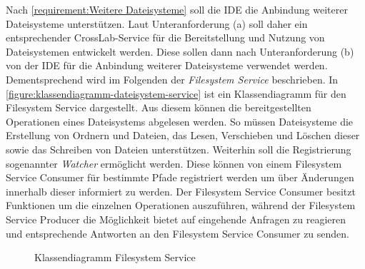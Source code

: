 Nach \autoref{requirement:Weitere Dateisysteme} soll die IDE die Anbindung weiterer Dateisysteme unterstützen. Laut Unteranforderung (a) soll daher ein entsprechender CrossLab-Service für die Bereitstellung und Nutzung von Dateisystemen entwickelt werden. Diese sollen dann nach Unteranforderung (b) von der IDE für die Anbindung weiterer Dateisysteme verwendet werden. Dementsprechend wird im Folgenden der \textit{Filesystem Service} beschrieben. In \autoref{figure:klassendiagramm-dateisystem-service} ist ein Klassendiagramm für den Filesystem Service dargestellt. Aus diesem können die bereitgestellten Operationen eines Dateisystems abgelesen werden. So müssen Dateisysteme die Erstellung von Ordnern und Dateien, das Lesen, Verschieben und Löschen dieser sowie das Schreiben von Dateien unterstützen. Weiterhin soll die Registrierung sogenannter \textit{Watcher} ermöglicht werden. Diese können von einem Filesystem Service Consumer für bestimmte Pfade registriert werden um über Änderungen innerhalb dieser informiert zu werden. Der Filesystem Service Consumer besitzt Funktionen um die einzelnen Operationen auszuführen, während der Filesystem Service Producer die Möglichkeit bietet auf eingehende Anfragen zu reagieren und entsprechende Antworten an den Filesystem Service Consumer zu senden.

\begin{figure}[tbp]
    \centering
    \caption{Klassendiagramm Filesystem Service}
    \label{figure:klassendiagramm-dateisystem-service}
\end{figure}

